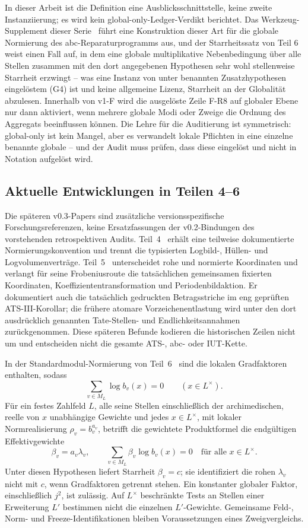 \documentclass[11pt,a4paper]{article}
\begin{document}
In dieser Arbeit ist die Definition eine Ausblicksschnittstelle, keine zweite
Instanziierung; es wird kein global-only-Ledger-Verdikt berichtet. Das
Werkzeug-Supplement dieser Serie~\cite{gnc} führt eine Konstruktion dieser
Art für die globale Normierung des abc-Reparaturprogramms aus, und der
Starrheitssatz von Teil 6~\cite{part6} weist einen Fall auf, in dem eine
globale multiplikative Nebenbedingung über alle Stellen zusammen mit den dort
angegebenen Hypothesen sehr wohl stellenweise Starrheit erzwingt -- was eine
Instanz von unter benannten Zusatzhypothesen eingelöstem (G4) ist und keine
allgemeine Lizenz, Starrheit an der Globalität abzulesen. Innerhalb von v1-F
wird die ausgelöste Zeile F-R8 auf globaler Ebene nur dann aktiviert, wenn
mehrere globale Modi oder Zweige die Ordnung des Aggregats beeinflussen
können. Die Lehre für die Auditierung ist symmetrisch: global-only ist kein
Mangel, aber es verwandelt lokale Pflichten in eine einzelne benannte
globale -- und der Audit muss prüfen, dass diese eingelöst und nicht in
Notation aufgelöst wird.

\subsection{Aktuelle Entwicklungen in Teilen 4--6}\label{sec:current-series}

Die späteren v0.3-Papers sind zusätzliche versionsspezifische
Forschungsreferenzen, keine Ersatzfassungen der v0.2-Bindungen des
vorstehenden retrospektiven Audits. Teil~4~\cite{part4current} erhält eine
teilweise dokumentierte Normierungskonvention und trennt die typisierten
Logbild-, Hüllen- und Logvolumenverträge. Teil~5~\cite{part5current}
unterscheidet rohe und normierte Koordinaten und verlangt für seine
Frobeniusroute die tatsächlichen gemeinsamen fixierten Koordinaten,
Koeffiziententransformation und Periodenbildaktion. Er dokumentiert auch
die tatsächlich gedruckten Betragsstriche im eng geprüften ATS-III-Korollar;
die frühere atomare Vorzeichenentlastung wird unter den dort ausdrücklich
genannten Tate-Stellen- und Endlichkeitsannahmen zurückgenommen. Diese
späteren Befunde kodieren die historischen Zeilen nicht um und entscheiden
nicht die gesamte ATS-, abc- oder IUT-Kette.

In der Standardmodul-Normierung von Teil~6~\cite{part6current} sind die
lokalen Gradfaktoren enthalten, sodass
\[
 \sum_{v\in M_L}\log b_v(x)=0\qquad(x\in L^\times).
\]
Für ein festes Zahlfeld $L$, alle seine Stellen einschließlich der
archimedischen, reelle von $x$ unabhängige Gewichte und jedes
$x\in L^\times$, mit lokaler Normrealisierung $\rho_v=b_v^{a_v}$,
betrifft die gewichtete Produktformel die endgültigen
Effektivgewichte
\[
 \beta_v=a_v\lambda_v,\qquad
 \sum_{v\in M_L}\beta_v\log b_v(x)=0\quad\text{für alle }x\in L^\times.
\]
Unter diesen Hypothesen liefert Starrheit $\beta_v=c$; sie identifiziert
die rohen $\lambda_v$ nicht mit $c$, wenn Gradfaktoren getrennt stehen.
Ein konstanter globaler Faktor, einschließlich $j^2$, ist zulässig.
Auf $L^\times$ beschränkte Tests an Stellen einer Erweiterung $L'$
bestimmen nicht die einzelnen $L'$-Gewichte. Gemeinsame Feld-, Norm- und
Freeze-Identifikationen bleiben Voraussetzungen eines Zweigvergleichs.
\end{document}
